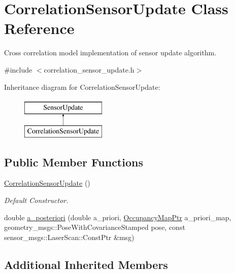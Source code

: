 \hypertarget{classCorrelationSensorUpdate}{\section{Correlation\-Sensor\-Update Class Reference}
\label{classCorrelationSensorUpdate}
}


Cross correlation model implementation of sensor update algorithm.  




{\ttfamily \#include $<$correlation\-\_\-sensor\-\_\-update.\-h$>$}

Inheritance diagram for Correlation\-Sensor\-Update\-:\begin{figure}[H]
\begin{center}
\leavevmode
\includegraphics[height=2.000000cm]{classCorrelationSensorUpdate}
\end{center}
\end{figure}
\subsection*{Public Member Functions}
\begin{DoxyCompactItemize}
\item 
\hypertarget{classCorrelationSensorUpdate_a0f43ac21ac425802edb523f5f065a0b0}{\hyperlink{classCorrelationSensorUpdate_a0f43ac21ac425802edb523f5f065a0b0}{Correlation\-Sensor\-Update} ()}\label{classCorrelationSensorUpdate_a0f43ac21ac425802edb523f5f065a0b0}

\begin{DoxyCompactList}\small\item\em Default Constructor. \end{DoxyCompactList}\item 
double \hyperlink{classCorrelationSensorUpdate_a72b2bd8daa21b7c76de0eb306e579906}{a\-\_\-posteriori} (double a\-\_\-priori, \hyperlink{occupancy__map_8h_aea86d1b633e7d9b44b660a39fa9b50f7}{Occupancy\-Map\-Ptr} a\-\_\-priori\-\_\-map, geometry\-\_\-msgs\-::\-Pose\-With\-Covariance\-Stamped pose, const sensor\-\_\-msgs\-::\-Laser\-Scan\-::\-Const\-Ptr \&msg)
\end{DoxyCompactItemize}
\subsection*{Additional Inherited Members}


